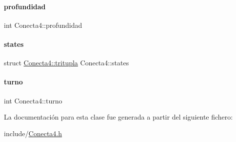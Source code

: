 \paragraph{\texorpdfstring{profundidad}{profundidad}}
{\footnotesize\ttfamily int Conecta4\+::profundidad}

\hypertarget{classConecta4_a4b4ec9e600e539e8f9863a978f45a95f}{}\label{classConecta4_a4b4ec9e600e539e8f9863a978f45a95f} 
\paragraph{\texorpdfstring{states}{states}}
{\footnotesize\ttfamily struct \hyperlink{structConecta4_1_1tritupla}{Conecta4\+::tritupla}  Conecta4\+::states}

\hypertarget{classConecta4_aa26fd11095863677ff31ec9b5811fc09}{}\label{classConecta4_aa26fd11095863677ff31ec9b5811fc09} 
\paragraph{\texorpdfstring{turno}{turno}}
{\footnotesize\ttfamily int Conecta4\+::turno}



La documentación para esta clase fue generada a partir del siguiente fichero\+:\begin{DoxyCompactItemize}
\item 
include/\hyperlink{Conecta4_8h}{Conecta4.\+h}\end{DoxyCompactItemize}
